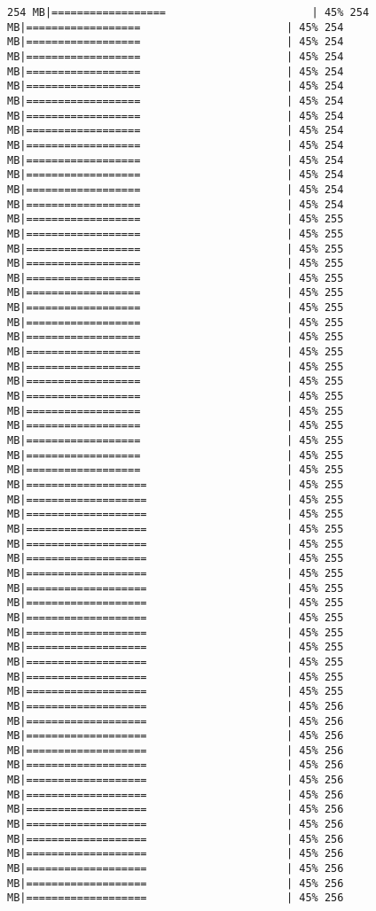 \documentclass[
]{article}
\begin{document}
\begin{verbatim}
254 MB|==================                       | 45% 254 MB|==================                       | 45% 254 MB|==================                       | 45% 254 MB|==================                       | 45% 254 MB|==================                       | 45% 254 MB|==================                       | 45% 254 MB|==================                       | 45% 254 MB|==================                       | 45% 254 MB|==================                       | 45% 254 MB|==================                       | 45% 254 MB|==================                       | 45% 254 MB|==================                       | 45% 254 MB|==================                       | 45% 254 MB|==================                       | 45% 254 MB|==================                       | 45% 255 MB|==================                       | 45% 255 MB|==================                       | 45% 255 MB|==================                       | 45% 255 MB|==================                       | 45% 255 MB|==================                       | 45% 255 MB|==================                       | 45% 255 MB|==================                       | 45% 255 MB|==================                       | 45% 255 MB|==================                       | 45% 255 MB|==================                       | 45% 255 MB|==================                       | 45% 255 MB|==================                       | 45% 255 MB|==================                       | 45% 255 MB|==================                       | 45% 255 MB|==================                       | 45% 255 MB|==================                       | 45% 255 MB|==================                       | 45% 255 MB|===================                      | 45% 255 MB|===================                      | 45% 255 MB|===================                      | 45% 255 MB|===================                      | 45% 255 MB|===================                      | 45% 255 MB|===================                      | 45% 255 MB|===================                      | 45% 255 MB|===================                      | 45% 255 MB|===================                      | 45% 255 MB|===================                      | 45% 255 MB|===================                      | 45% 255 MB|===================                      | 45% 255 MB|===================                      | 45% 255 MB|===================                      | 45% 255 MB|===================                      | 45% 255 MB|===================                      | 45% 256 MB|===================                      | 45% 256 MB|===================                      | 45% 256 MB|===================                      | 45% 256 MB|===================                      | 45% 256 MB|===================                      | 45% 256 MB|===================                      | 45% 256 MB|===================                      | 45% 256 MB|===================                      | 45% 256 MB|===================                      | 45% 256 MB|===================                      | 45% 256 MB|===================                      | 45% 256 MB|===================                      | 45% 256 MB|===================                      | 45% 256 
\end{verbatim}
\end{document}
